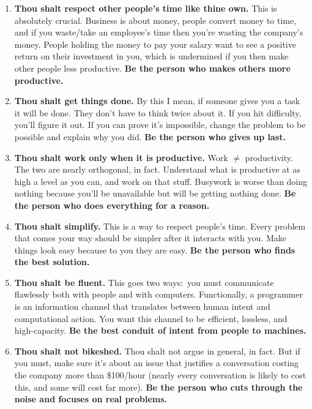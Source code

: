 \documentclass{article}
\begin{document}
\begin{enumerate}
\item{\bf Thou shalt respect other people's time like thine own.}
  This is absolutely crucial. Business is about money, people convert money
  to time, and if you waste/take an employee's time then you're wasting the
  company's money. People holding the money to pay your salary want to see
  a positive return on their investment in you, which is undermined if you
  then make other people less productive. {\bf Be the person who makes
  others more productive.}

\item{\bf Thou shalt get things done.}
  By this I mean, if someone gives you a task it will be done. They don't
  have to think twice about it. If you hit difficulty, you'll figure it
  out. If you can prove it's impossible, change the problem to be possible
  and explain why you did. {\bf Be the person who gives up last.}

\item{\bf Thou shalt work only when it is productive.}
  Work $\ne$ productivity. The two are nearly orthogonal, in fact.
  Understand what is productive at as high a level as you can, and work on
  that stuff. Busywork is worse than doing nothing because you'll be
  unavailable but will be getting nothing done. {\bf Be the person who does
  everything for a reason.}

\item{\bf Thou shalt simplify.}
  This is a way to respect people's time. Every problem that comes your way
  should be simpler after it interacts with you. Make things look easy
  because to you they are easy. {\bf Be the person who finds the best
  solution.}

\item{\bf Thou shalt be fluent.}
  This goes two ways:~you must communicate flawlessly both with people and
  with computers. Functionally, a programmer is an information channel that
  translates between human intent and computational action. You want this
  channel to be efficient, lossless, and high-capacity. {\bf Be the best
  conduit of intent from people to machines.}

\item{\bf Thou shalt not bikeshed.}
  Thou shalt not argue in general, in fact. But if you must, make sure it's
  about an issue that justifies a conversation costing the company more
  than \$100/hour (nearly every conversation is likely to cost this, and
  some will cost far more). {\bf Be the person who cuts through the noise
  and focuses on real problems.}
\end{enumerate}
\end{document}
